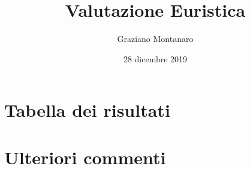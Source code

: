 \documentclass[french]{article}
\title{Valutazione Euristica}
\author{Graziano Montanaro}
\date{28 dicembre 2019}
\begin{document}
\maketitle

\section{Tabella dei risultati}



\section{Ulteriori commenti}
\end{document}
